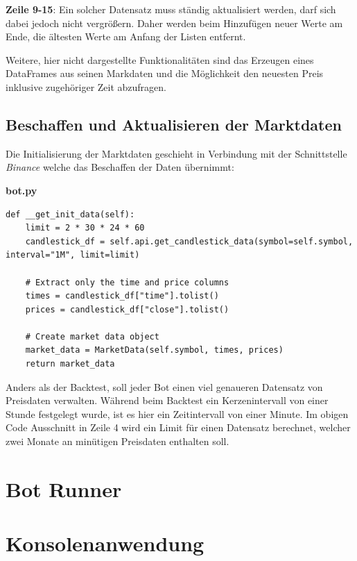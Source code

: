 \documentclass[oneside]{ausarbeitung}
\begin{document}
\textbf{Zeile 9-15}: Ein solcher Datensatz muss ständig aktualisiert werden, darf sich dabei jedoch nicht vergrößern. Daher werden beim Hinzufügen neuer Werte am Ende, die ältesten Werte am Anfang der Listen entfernt.

Weitere, hier nicht dargestellte Funktionalitäten sind das Erzeugen eines DataFrames aus seinen Markdaten und die Möglichkeit den neuesten Preis inklusive zugehöriger Zeit abzufragen.

\subsection{Beschaffen und Aktualisieren der Marktdaten}
\label{sub:beschaffen_und_aktualisieren_der_marktdaten}

Die Initialisierung der Marktdaten geschieht in Verbindung mit der Schnittstelle \textit{Binance} welche das Beschaffen der Daten übernimmt:

\lstset{language=Python}
\lstset{frame=lines}
\lstset{basicstyle=\footnotesize}
\textbf{bot.py}
\begin{lstlisting}
def __get_init_data(self):
	limit = 2 * 30 * 24 * 60
	candlestick_df = self.api.get_candlestick_data(symbol=self.symbol, interval="1M", limit=limit)

	# Extract only the time and price columns
	times = candlestick_df["time"].tolist()
	prices = candlestick_df["close"].tolist()

	# Create market data object
	market_data = MarketData(self.symbol, times, prices)
	return market_data
\end{lstlisting}

Anders als der Backtest, soll jeder Bot einen viel genaueren Datensatz von Preisdaten verwalten. Während beim Backtest ein Kerzenintervall von einer Stunde festgelegt wurde, ist es hier ein Zeitintervall von einer Minute. Im obigen Code Ausschnitt in Zeile 4 wird ein Limit für einen Datensatz berechnet, welcher zwei Monate an minütigen Preisdaten enthalten soll.


\section{Bot Runner}
\label{sec:bot_runner}


\section{Konsolenanwendung}
\label{sec:konsolenanwendung}
\end{document}
